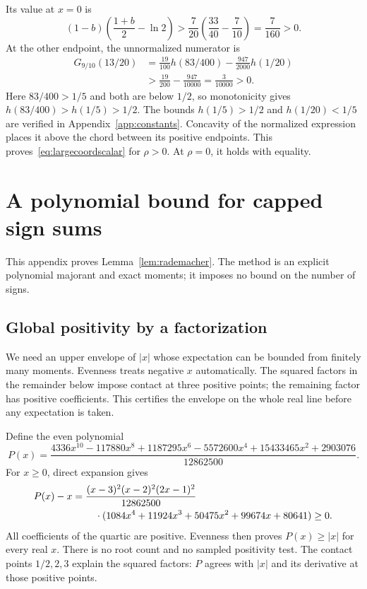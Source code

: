 Its value at $x=0$ is
\[
(1-b)\left(\frac{1+b}{2}-\ln2\right)
>\frac7{20}\left(\frac{33}{40}-\frac7{10}\right)=\frac7{160}>0.
\]
At the other endpoint, the unnormalized numerator is
\begin{align*}
G_{9/10}(13/20)
&=\frac{19}{100}h(83/400)-\frac{947}{2000}h(1/20)\\
&>\frac{19}{200}-\frac{947}{10000}=\frac3{10000}>0.
\end{align*}
Here $83/400>1/5$ and both are below $1/2$, so monotonicity gives $h(83/400)>h(1/5)>1/2$. The bounds $h(1/5)>1/2$ and $h(1/20)<1/5$ are verified in Appendix~\ref{app:constants}. Concavity of the normalized expression places it above the chord between its positive endpoints. This proves~\eqref{eq:largecoordscalar} for $\rho>0$. At $\rho=0$, it holds with equality.

\section{A polynomial bound for capped sign sums}\label{app:fourierconstants}
This appendix proves Lemma~\ref{lem:rademacher}. The method is an explicit polynomial majorant and exact moments; it imposes no bound on the number of signs.

\subsection{Global positivity by a factorization}
We need an upper envelope of $|x|$ whose expectation can be bounded from finitely many moments. Evenness treats negative $x$ automatically. The squared factors in the remainder below impose contact at three positive points; the remaining factor has positive coefficients. This certifies the envelope on the whole real line before any expectation is taken.

Define the even polynomial
\begin{equation}\label{eq:majorant}
P(x)=\frac{4336x^{10}-117880x^8+1187295x^6-5572600x^4+15433465x^2+2903076}{12862500}.
\end{equation}
For $x\ge0$, direct expansion gives
\begin{align}\label{eq:majorantfactor}
P(x)-x={}&\frac{(x-3)^2(x-2)^2(2x-1)^2}{12862500}\notag\\
&\quad\cdot(1084x^4+11924x^3+50475x^2+99674x+80641)\ge0.
\end{align}
All coefficients of the quartic are positive. Evenness then proves $P(x)\ge|x|$ for every real $x$. There is no root count and no sampled positivity test. The contact points $1/2,2,3$ explain the squared factors: $P$ agrees with $|x|$ and its derivative at those positive points.

